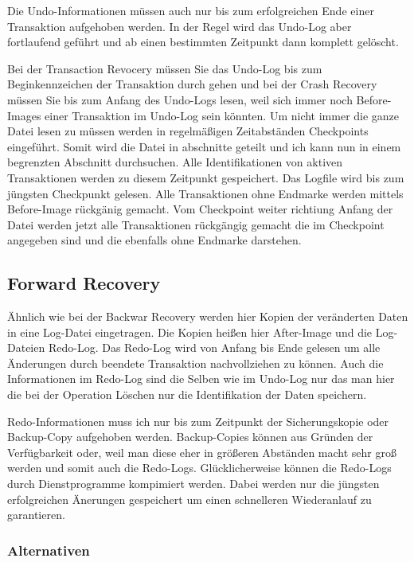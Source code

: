 \begin{flushleft}
Die Undo-Informationen müssen auch nur bis zum erfolgreichen Ende einer Transaktion aufgehoben werden. In der Regel wird das Undo-Log aber fortlaufend geführt und ab einen bestimmten Zeitpunkt dann komplett gelöscht. 

Bei der Transaction Revocery müssen Sie das Undo-Log bis zum Beginkennzeichen der Transaktion durch gehen und bei der Crash Recovery müssen Sie bis zum Anfang des Undo-Logs lesen, weil sich immer noch Before-Images einer Transaktion im Undo-Log sein könnten. Um nicht immer die ganze Datei lesen zu müssen werden in regelmäßigen Zeitabständen Checkpoints eingeführt. Somit wird die Datei in abschnitte geteilt und ich kann nun in einem begrenzten Abschnitt durchsuchen. Alle Identifikationen von aktiven Transaktionen werden zu diesem Zeitpunkt gespeichert. Das Logfile wird bis zum jüngsten Checkpunkt gelesen. Alle Transaktionen ohne Endmarke werden mittels Before-Image rückgänig gemacht. Vom Checkpoint weiter richtiung Anfang der Datei werden jetzt alle Transaktionen rückgängig gemacht die im Checkpoint angegeben sind und die ebenfalls ohne Endmarke darstehen.

\subsection{Forward Recovery}

Ähnlich wie bei der Backwar Recovery werden hier Kopien der veränderten Daten in eine Log-Datei eingetragen. Die Kopien heißen hier After-Image und die Log-Dateien Redo-Log. Das Redo-Log wird von Anfang bis Ende gelesen um alle Änderungen durch beendete Transaktion nachvollziehen zu können. Auch die Informationen im Redo-Log sind die Selben wie im Undo-Log nur das man hier die bei der Operation Löschen nur die Identifikation der Daten speichern.

Redo-Informationen muss ich nur bis zum Zeitpunkt der Sicherungskopie oder Backup-Copy aufgehoben werden. Backup-Copies können aus Gründen der Verfügbarkeit oder, weil man diese eher in größeren Abständen macht sehr groß werden und somit auch die Redo-Logs. Glücklicherweise können die Redo-Logs durch Dienstprogramme kompimiert werden. Dabei werden nur die jüngsten erfolgreichen Änerungen gespeichert um einen schnelleren Wiederanlauf zu garantieren.

\subsubsection{Alternativen}


\end{flushleft}
